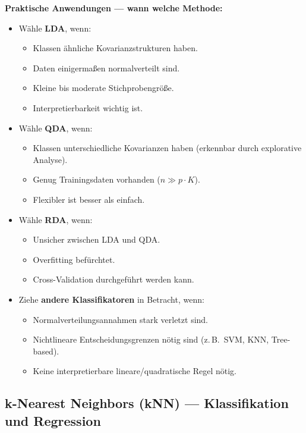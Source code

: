 \textbf{Praktische Anwendungen — wann welche Methode:}
\begin{itemize}[leftmargin=1.5em]
    \item Wähle \textbf{LDA}, wenn:
    \begin{itemize}
        \item Klassen ähnliche Kovarianzstrukturen haben.
        \item Daten einigermaßen normalverteilt sind.
        \item Kleine bis moderate Stichprobengröße.
        \item Interpretierbarkeit wichtig ist.
    \end{itemize}
    
    \item Wähle \textbf{QDA}, wenn:
    \begin{itemize}
        \item Klassen unterschiedliche Kovarianzen haben (erkennbar durch explorative Analyse).
        \item Genug Trainingsdaten vorhanden ($n \gg p \cdot K$).
        \item Flexibler ist besser als einfach.
    \end{itemize}
    
    \item Wähle \textbf{RDA}, wenn:
    \begin{itemize}
        \item Unsicher zwischen LDA und QDA.
        \item Overfitting befürchtet.
        \item Cross-Validation durchgeführt werden kann.
    \end{itemize}
    
    \item Ziehe \textbf{andere Klassifikatoren} in Betracht, wenn:
    \begin{itemize}
        \item Normalverteilungsannahmen stark verletzt sind.
        \item Nichtlineare Entscheidungsgrenzen nötig sind (z.\,B.\ SVM, KNN, Tree-based).
        \item Keine interpretierbare lineare/quadratische Regel nötig.
    \end{itemize}
\end{itemize}

\newpage

\subsection{k-Nearest Neighbors (kNN) — Klassifikation und Regression}

